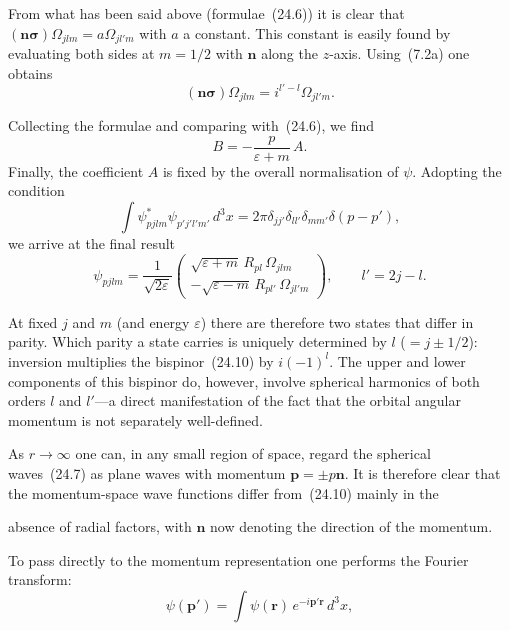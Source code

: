 From what has been said above (formulae~(24.6)) it is clear that $(\mathbf{n}\boldsymbol{\sigma})\Omega_{jlm} = a\Omega_{jl'm}$ with $a$ a constant. This constant is easily found by evaluating both sides at $m = 1/2$ with $\mathbf{n}$ along the $z$-axis. Using~(7.2a) one obtains
\begin{equation}
(\mathbf{n}\boldsymbol{\sigma})\Omega_{jlm} = i^{l'-l}\Omega_{jl'm}.
\tag{24.8}
\end{equation}

Collecting the formulae and comparing with~(24.6), we find
\[
B = -\frac{p}{\varepsilon + m}\,A.
\]
Finally, the coefficient $A$ is fixed by the overall normalisation of $\psi$. Adopting the condition
\begin{equation}
\int \psi^*_{pjlm}\psi_{p'j'l'm'}\,d^3x = 2\pi\delta_{jj'}\delta_{ll'}\delta_{mm'}\delta(p - p'),
\tag{24.9}
\end{equation}
we arrive at the final result
\begin{equation}
\psi_{pjlm} = \frac{1}{\sqrt{2\varepsilon}}\begin{pmatrix} \sqrt{\varepsilon + m}\,R_{pl}\,\Omega_{jlm}\\ -\sqrt{\varepsilon - m}\,R_{pl'}\,\Omega_{jl'm} \end{pmatrix},\qquad l' = 2j - l.
\tag{24.10}
\end{equation}

At fixed $j$ and $m$ (and energy $\varepsilon$) there are therefore two states that differ in parity. Which parity a state carries is uniquely determined by $l$ ($= j \pm 1/2$): inversion multiplies the bispinor~(24.10) by $i(-1)^l$. The upper and lower components of this bispinor do, however, involve spherical harmonics of both orders $l$ and $l'$---a direct manifestation of the fact that the orbital angular momentum is not separately well-defined.

As $r \to \infty$ one can, in any small region of space, regard the spherical waves~(24.7) as plane waves with momentum $\mathbf{p} = \pm p\mathbf{n}$. It is therefore clear that the momentum-space wave functions differ from~(24.10) mainly in the

absence of radial factors, with $\mathbf{n}$ now denoting the direction of the momentum.

To pass directly to the momentum representation one performs the Fourier transform:
\begin{equation}
\psi(\mathbf{p}') = \int \psi(\mathbf{r})\,e^{-i\mathbf{p}'\mathbf{r}}\,d^3x,
\tag{24.11}
\end{equation}

